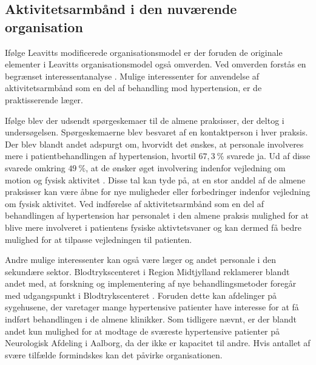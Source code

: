 \subsection{Aktivitetsarmbånd i den nuværende organisation}
Ifølge Leavitts modificerede organisationsmodel er der foruden de originale elementer i Leavitts organisationsmodel også omverden. Ved omverden forstås en begrænset interessentanalyse \citep{mtvhaandbog}. Mulige interessenter for anvendelse af aktivitetsarmbånd som en del af behandling mod hypertension, er de praktisserende læger.

Ifølge \cite{munck2007} blev der udsendt spørgeskemaer til de almene praksisser, der deltog i undersøgelsen. Spørgeskemaerne blev besvaret af en kontaktperson i hver praksis. Der blev blandt andet adspurgt om, hvorvidt det ønskes, at personale involveres mere i patientbehandlingen af hypertension, hvortil $67,3~\%$ svarede ja. Ud af disse svarede omkring $49~\%$, at de ønsker øget involvering indenfor vejledning om motion og fysisk aktivitet \citep{munck2007}. Disse tal kan tyde på, at en stor anddel af de almene praksisser kan være åbne for nye muligheder eller forbedringer indenfor vejledning om fysisk aktivitet. Ved indførelse af aktivitetsarmbånd som en del af behandlingen af hypertension har personalet i den almene praksis mulighed for at blive mere involveret i patientens fysiske aktivtetsvaner og kan dermed få bedre mulighed for at tilpasse vejledningen til patienten. 

Andre mulige interessenter kan også være læger og andet personale i den sekundære sektor. Blodtrykscenteret i Region Midtjylland reklamerer blandt andet med, at forskning og implementering af nye behandlingsmetoder foregår med udgangspunkt i Blodtrykscenteret \citep{aarhusuniversitetshospital}. Foruden dette kan afdelinger på sygehusene, der varetager mange hypertensive patienter have interesse for at få indført behandlingen i de almene klinikker. Som tidligere nævnt, er der blandt andet kun mulighed for at modtage de sværeste hypertensive patienter på Neurologisk Afdeling i Aalborg, da der ikke er kapacitet til andre. Hvis antallet af svære tilfælde formindskes kan det påvirke organisationen. 



